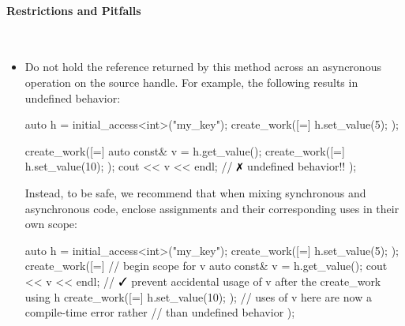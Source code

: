 \paragraph{Restrictions and Pitfalls}\mbox{}\\ 
\begin{itemize}
  \item Do not hold the reference returned by this method across an asyncronous
    operation on the source \gls{handle}.  For example, the following results in
  undefined behavior:
  \begin{CppCode}
	auto h = initial_access<int>("my_key"); 
	create_work([=]{ h.set_value(5); });
	
	create_work([=]{ 
	  auto const& v = h.get_value();
	  create_work([=]{ h.set_value(10); });
	  cout << v << endl; // $\no$ undefined behavior!!
	});
  \end{CppCode}
  Instead, to be safe, we recommend that when mixing synchronous and
  asynchronous code, enclose assignments and their corresponding uses in their
  own scope:
  \begin{CppCode}
	auto h = initial_access<int>("my_key"); 
	create_work([=]{ h.set_value(5); });
	create_work([=]{ 
	  { // begin scope for v
		auto const& v = h.get_value();
		cout << v << endl; 
	  } // $\yes$ prevent accidental usage of v after the create_work using h
	  create_work([=]{ h.set_value(10); });
	  // uses of v here are now a compile-time error rather 
    // than undefined behavior
	});
  \end{CppCode}
\end{itemize}
